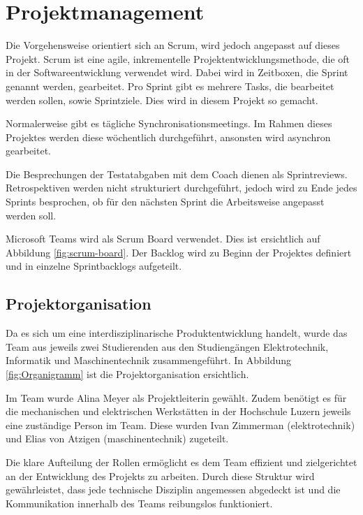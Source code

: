 \section{Projektmanagement}

Die Vorgehensweise orientiert sich an Scrum, wird jedoch angepasst auf dieses Projekt.
Scrum ist eine agile, inkrementelle Projektentwicklungsmethode, die oft in der Softwareentwicklung verwendet wird. Dabei wird in Zeitboxen, die Sprint genannt werden, gearbeitet. Pro Sprint gibt es mehrere Tasks, die bearbeitet werden sollen, sowie Sprintziele. Dies wird in diesem Projekt so gemacht.\cite{wikipedia-scrum}

Normalerweise gibt es tägliche Synchronisationsmeetings. Im Rahmen dieses Projektes werden diese wöchentlich durchgeführt, ansonsten wird asynchron gearbeitet.

Die Besprechungen der Testatabgaben mit dem Coach dienen als Sprintreviews. Retrospektiven werden nicht strukturiert durchgeführt, jedoch wird zu Ende jedes Sprints besprochen, ob für den nächsten Sprint die Arbeitsweise angepasst werden soll.

Microsoft Teams wird als Scrum Board verwendet. Dies ist ersichtlich auf Abbildung \ref{fig:scrum-board}. Der Backlog wird zu Beginn der Projektes definiert und in einzelne Sprintbacklogs aufgeteilt.

\subsection{Projektorganisation}

Da es sich um eine interdisziplinarische Produktentwicklung handelt, wurde das Team aus jeweils zwei Studierenden aus den Studiengängen Elektrotechnik, Informatik und Maschinentechnik zusammengeführt. In Abbildung \ref{fig:Organigramm} ist die Projektorganisation ersichtlich. 

Im Team wurde Alina Meyer als Projektleiterin gewählt. Zudem benötigt es für die mechanischen und elektrischen Werkstätten in der Hochschule Luzern jeweils eine zuständige Person im Team. Diese wurden Ivan Zimmerman (\acrshort{elektrotechnik}) und Elias von Atzigen (\acrshort{maschinentechnik}) zugeteilt.

Die klare Aufteilung der Rollen ermöglicht es dem Team effizient und zielgerichtet an der Entwicklung des Projekts zu arbeiten. Durch diese Struktur wird gewährleistet, dass jede technische Disziplin angemessen abgedeckt ist und die Kommunikation innerhalb des Teams reibungslos funktioniert.


